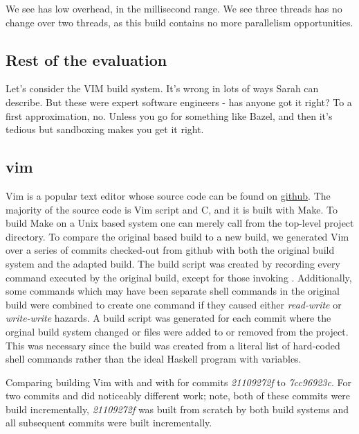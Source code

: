 We see \Rattle has low overhead, in the millisecond range. We see three threads has no change over two threads, as this build contains no more parallelism opportunities.

\subsection{Rest of the evaluation}

Let's consider the VIM build system. It's wrong in lots of ways Sarah can describe. But these were expert software engineers - has anyone got it right? To a first approximation, no. Unless you go for something like Bazel, and then it's tedious but sandboxing makes you get it right.


\subsection{vim}

Vim is a popular text editor whose source code can be found on \href{https://github.com/vim/vim}{github}.  The majority of the source code is Vim script and C, and it is built with Make.  To build Make on a Unix based system one can merely call \Make from the top-level project directory.  To compare the original \Make based build to a new \Rattle build, we generated Vim over a series of commits checked-out from github with both the original build system and the adapted \Rattle build.  The \Rattle build script was created by recording every command executed by the original build, except for those invoking \Make.  Additionally, some commands which may have been separate shell commands in the original build were combined to create one command if they caused either \emph{read-write} or \emph{write-write} hazards.  A \Rattle build script was generated for each commit where the orginal build system changed or files were added to or removed from the project.  This was necessary since the \Rattle build was created from a literal list of hard-coded shell commands rather than the ideal Haskell program with variables.


Comparing building Vim \cite{} with \Make and with \Rattle for commits \emph{21109272f} to \emph{7cc96923c}.  For two commits \Make and \Rattle did noticeably different work; note, both of these commits were build incrementally, \emph{21109272f} was built from scratch by both build systems and all subsequent commits were built incrementally.

